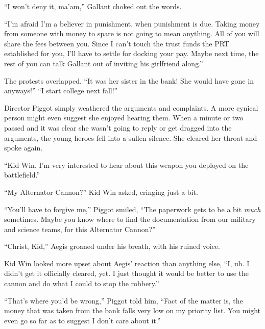 ``I won't deny it, ma'am,'' Gallant choked out the words.



``I'm afraid I'm a believer in punishment, when punishment is due.  Taking money from someone with money to spare is not going to mean anything.  All of you will share the fees between you.  Since I can't touch the trust funds the PRT established for you, I'll have to settle for docking your pay.  Maybe next time, the rest of you can talk Gallant out of inviting his girlfriend along.''



The protests overlapped. ``It was her sister in the bank!  She would have gone in anyways!''  ``I start college next fall!''



Director Piggot simply weathered the arguments and complaints.  A more cynical person might even suggest she enjoyed hearing them.  When a minute or two passed and it was clear she wasn't going to reply or get dragged into the arguments, the young heroes fell into a sullen silence.  She cleared her throat and spoke again.



``Kid Win.  I'm very interested to hear about this weapon you deployed on the battlefield.''



``My Alternator Cannon?''  Kid Win asked, cringing just a bit.



``You'll have to forgive me,'' Piggot smiled, ``The paperwork gets to be a bit \emph{much} sometimes.  Maybe you know where to find the documentation from our military and science teams, for this Alternator Cannon?''



``Christ, Kid,'' Aegis groaned under his breath, with his ruined voice.



Kid Win looked more upset about Aegis' reaction than anything else, ``I, uh.  I didn't get it officially cleared, yet.  I just thought it would be better to use the cannon and do what I could to stop the robbery.''



``That's where you'd be wrong,'' Piggot told him, ``Fact of the matter is, the money that was taken from the bank falls very low on my priority list.  You might even go so far as to suggest I don't care about it.''



